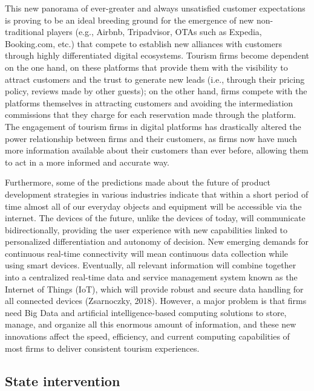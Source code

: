 \documentclass[
  letterpaper,
  DIV=11,
  numbers=noendperiod]{scrreprt}
\begin{document}
This new panorama of ever-greater and always unsatisfied customer
expectations is proving to be an ideal breeding ground for the emergence
of new non-traditional players (e.g., Airbnb, Tripadvisor, OTAs such as
Expedia, Booking.com, etc.) that compete to establish new alliances with
customers through highly differentiated digital ecosystems. Tourism
firms become dependent on the one hand, on these platforms that provide
them with the visibility to attract customers and the trust to generate
new leads (i.e., through their pricing policy, reviews made by other
guests); on the other hand, firms compete with the platforms themselves
in attracting customers and avoiding the intermediation commissions that
they charge for each reservation made through the platform. The
engagement of tourism firms in digital platforms has drastically altered
the power relationship between firms and their customers, as firms now
have much more information available about their customers than ever
before, allowing them to act in a more informed and accurate way.

Furthermore, some of the predictions made about the future of product
development strategies in various industries indicate that within a
short period of time almost all of our everyday objects and equipment
will be accessible via the internet. The devices of the future, unlike
the devices of today, will communicate bidirectionally, providing the
user experience with new capabilities linked to personalized
differentiation and autonomy of decision. New emerging demands for
continuous real-time connectivity will mean continuous data collection
while using smart devices. Eventually, all relevant information will
combine together into a centralized real-time data and service
management system known as the Internet of Things (IoT), which will
provide robust and secure data handling for all connected devices
(Zsarnoczky, 2018). However, a major problem is that firms need Big Data
and artificial intelligence-based computing solutions to store, manage,
and organize all this enormous amount of information, and these new
innovations affect the speed, efficiency, and current computing
capabilities of most firms to deliver consistent tourism experiences.

\hypertarget{state-intervention}{%
\subsection{State intervention}\label{state-intervention}}
\end{document}
